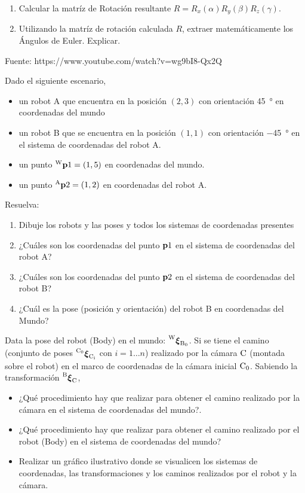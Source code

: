 \documentclass[tp]{lcc}
\begin{document}
\begin{enumerate}
    \item Calcular la matríz de Rotación resultante $R = R_{x}(\alpha) R_{y}(\beta) R_{z}(\gamma)$.
    \item Utilizando la matríz de rotación calculada $R$, extraer matemáticamente los Ángulos de Euler. Explicar.
\end{enumerate}

\begin{solucion}
    Fuente: https://www.youtube.com/watch?v=wg9bI8-Qx2Q
\end{solucion}


\ejercicio Dado el siguiente escenario,
\begin{itemize}
    \item un robot A que encuentra en la posición $(2,3)$ con orientación \SI{45}{\degree} en coordenadas del mundo
    \item un robot B que se encuentra en la posición $(1,1)$ con orientación \SI{-45}{\degree} en el sistema de coordenadas del robot A.
    \item un punto $\prescript{\mathrm{\mathrm{W}}}{}{\boldsymbol{\mathbf{p}}}1 = (1,5)$ en coordenadas del mundo.
    \item un punto $\prescript{\mathrm{A}}{}{\boldsymbol{\mathbf{p}}}2 = (1,2)$ en coordenadas del robot A.
\end{itemize}
Resuelva:
\begin{enumerate}
    \item Dibuje los robots y las poses y todos los sistemas de coordenadas presentes
    \item ¿Cuáles son los coordenadas del punto $\boldsymbol{\mathbf{p}}1$ en el sistema de coordenadas del robot A?
    \item ¿Cuáles son los coordenadas del punto $\boldsymbol{\mathbf{p}}2$ en el sistema de coordenadas del robot B?
    \item ¿Cuál es la pose (posición y orientación) del robot B en coordenadas del Mundo?
\end{enumerate}

\ejercicio Data la pose del robot (Body) en el mundo: $\prescript{\mathrm{\mathrm{W}}}{}{{\boldsymbol{\mathbf{\xi}}}_\mathrm{\mathrm{B}_{0}}}$. Si se tiene el camino (conjunto de poses $\prescript{\mathrm{\mathrm{C}_{0}}}{}{{\boldsymbol{\mathbf{\xi}}}_\mathrm{\mathrm{C}_{i}}}$ con $i = 1 \dots n$) realizado por la cámara $\mathrm{C}$ (montada sobre el robot) en el marco de coordenadas de la cámara inicial $\mathrm{C}_{0}$. Sabiendo la transformación $\prescript{\mathrm{\mathrm{B}}}{}{{\boldsymbol{\mathbf{\xi}}}_\mathrm{\mathrm{C}}}$, 
\begin{itemize}
	\item ¿Qué procedimiento hay que realizar para obtener el camino realizado por la cámara en el sistema de coordenadas del mundo?.
	\item ¿Qué procedimiento hay que realizar para obtener el camino realizado por el robot (Body) en el sistema de coordenadas del mundo?
    \item Realizar un gráfico ilustrativo donde se visualicen los sistemas de coordenadas, las transformaciones y los caminos realizados por el robot y la cámara.
\end{itemize}
\end{document}
